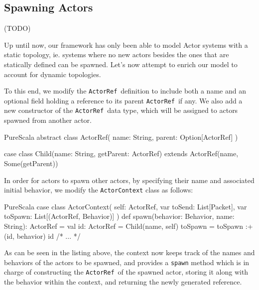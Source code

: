 \documentclass[a4paper,twoside]{article}
\newcommand{\InlineS}[1]{\lstinline[language=PureScala,basicstyle=\small\ttfamily,columns=fixed]|#1|}
\newcommand{\TODO}[1]{\textcolor{YellowOrange}{(TODO)}} %
\newcommand{\ActorRef}{\InlineS{ActorRef}\ }
\newcommand{\stt}[1]{\texttt{\small{#1}}}
\begin{document}
%

%

\subsection{Spawning Actors}
\label{spawn}

\TODO{Name Uniqueness}

Up until now, our framework has only been able to model Actor systems with a static topology, ie. systems where no new actors besides the ones that are statically defined can be spawned. Let's now attempt to enrich our model to account for dynamic topologies.

To this end, we modify the \ActorRef definition to include both a name and an optional field holding a reference to its parent \ActorRef if any. We also add a new constructor of the \ActorRef data type, which will be assigned to actors spawned from another actor.

\begin{ShortCode}{PureScala}
abstract class ActorRef(
  name: String,
  parent: Option[ActorRef]
)

case class Child(name: String, getParent: ActorRef)
  extends ActorRef(name, Some(getParent))
\end{ShortCode}

In order for actors to spawn other actors, by specifying their name and associated 
initial behavior, we modify the \stt{ActorContext} class as follows:

\begin{ShortCode}{PureScala}
case class ActorContext(
  self: ActorRef,
  var toSend: List[Packet],
  var toSpawn: List[(ActorRef, Behavior)]
) {
  def spawn(behavior: Behavior, name: String): ActorRef = {
    val id: ActorRef = Child(name, self)
    toSpawn = toSpawn :+ (id, behavior)
    id
  }
  /* ... */
}
\end{ShortCode}

As can be seen in the listing above, the context now keeps track of the names and 
behaviors of the actors to be spawned, and provides a \stt{spawn} method which is in 
charge of constructing the \ActorRef of the spawned actor, storing it along with the 
behavior within the context, and returning the newly generated reference.
\end{document}
